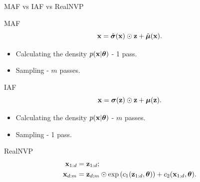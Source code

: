 \begin{frame}{MAF vs IAF vs RealNVP}
	\begin{block}{MAF}
		\vspace{-0.3cm}
		\[
		\mathbf{x} = \hat{\boldsymbol{\sigma}} (\mathbf{x}) \odot \mathbf{z} + \hat{\boldsymbol{\mu}}(\mathbf{x}).
		\]
		\vspace{-0.5cm}
		\begin{itemize}
			\item Calculating the density $p(\mathbf{x} | \boldsymbol{\theta})$ - 1 pass.
			\item Sampling - $m$ passes.
		\end{itemize}
	\end{block}
	\begin{block}{IAF}
		\vspace{-0.3cm}
		\[
		\mathbf{x} = \boldsymbol{\sigma} (\mathbf{z}) \odot \mathbf{z} + \boldsymbol{\mu}(\mathbf{z}).
		\]
		\vspace{-0.5cm}
		\begin{itemize}
			\item Calculating the density $p(\mathbf{x} | \boldsymbol{\theta})$ - $m$ passes.
			\item Sampling - 1 pass.
		\end{itemize}
	\end{block}
	\begin{block}{RealNVP}
		\vspace{-1cm}
		\begin{align*}
			\mathbf{x}_{1:d} &= \mathbf{z}_{1:d}; \\ \mathbf{x}_{d:m} &= \mathbf{z}_{d:m} \odot \exp \left(c_1(\mathbf{z}_{1:d}, \boldsymbol{\theta})\right) + c_2(\mathbf{x}_{1:d}, \boldsymbol{\theta}).
		\end{align*}
		\vspace{-0.3cm}
	\end{block}
\end{frame}
